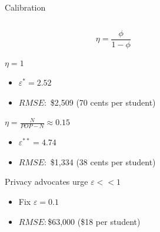 \begin{frame}[fragile]{Calibration}
\begin{columns}[T] %
\begin{column}{.58\textwidth}
  $$\eta = \frac{\phi}{1-\phi}$$
  \begin{wideitemize}
    \item<1-> $\eta=1$
    \begin{itemize}
    	\item<2->  $\varepsilon^{\ast}=2.52$
    	\item<2->  $RMSE:$ \$2,509 (70 cents per student)
    \end{itemize}
    \item<3-> $\eta= \frac{N}{POP-N}\approx 0.15$
    \begin{itemize}
    	\item<4-> $\varepsilon^{\ast\ast} = 4.74$
    	\item<4-> $RMSE:$ \$1,334 (38 cents per student)
    \end{itemize}
    \item<5-> Privacy advocates urge $\varepsilon<<1$
    \begin{itemize}
    	\item<6-> Fix $\varepsilon=0.1$
    	\item<6-> $RMSE: $\$63,000 (\$18 per student)
    \end{itemize}
  \end{wideitemize}
\end{column}%
\hfill%
\begin{column}{.38\textwidth}
\end{column}%
\end{columns}
\end{frame}

